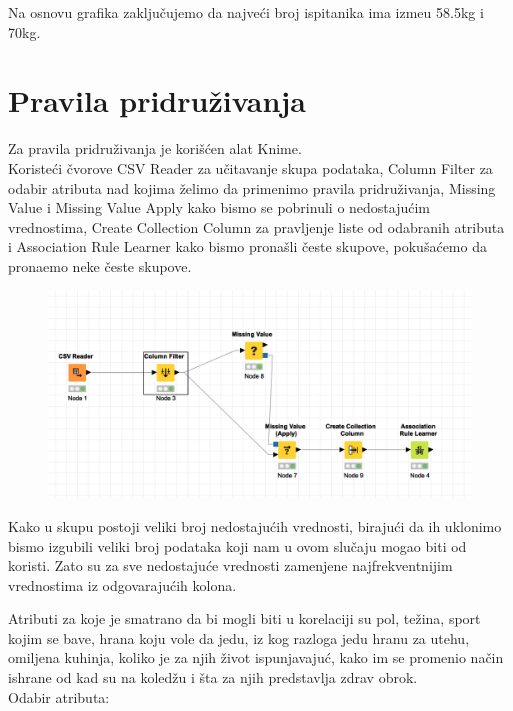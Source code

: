 \documentclass[12pt,a4paper]{article}
\begin{document}
Na osnovu grafika zaklju\v cujemo da najve\' ci broj ispitanika ima izme\dj u 58.5kg i 70kg.

\newpage

\section{Pravila pridru\v zivanja}

Za pravila pridru\v zivanja je kori\v s\' cen alat Knime.\\

Koriste\' ci \v cvorove CSV Reader za u\v citavanje skupa podataka, Column Filter za odabir atributa nad kojima \v zelimo da primenimo pravila pridru\v zivanja, Missing Value i Missing Value Apply kako bismo se pobrinuli o nedostaju\' cim vrednostima, Create Collection Column za pravljenje liste od odabranih atributa i Association Rule Learner kako bismo prona\v sli \v ceste skupove, poku\v sa\' cemo da prona\dj emo neke \v ceste skupove.

\begin{figure}[H]
  \centering
  \includegraphics[width=15cm]{knime}
\end{figure}

Kako u skupu postoji veliki broj nedostaju\' cih vrednosti, biraju\' ci da ih uklonimo bismo izgubili veliki broj podataka koji nam u ovom slu\v caju mogao biti od koristi. Zato su za sve nedostaju\' ce vrednosti zamenjene najfrekventnijim vrednostima iz odgovaraju\' cih kolona.
\newpage

Atributi za koje je smatrano da bi mogli biti u korelaciji su pol, te\v zina, sport kojim se bave, hrana koju vole da jedu, iz kog razloga jedu hranu za utehu, omiljena kuhinja, koliko je za njih \v zivot ispunjavaju\' c, kako im se promenio na\v cin ishrane od kad su na koled\v zu i \v sta za njih predstavlja zdrav obrok.\\
Odabir atributa: 
\end{document}
